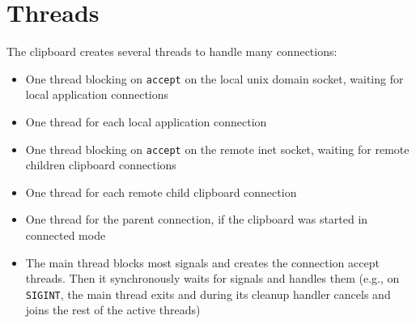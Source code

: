 \documentclass[a4paper, titlepage, english]{article}
\begin{document}
	\section{Threads}
	\par
	The clipboard creates several threads to handle many connections:
	\begin{itemize}
		\item One thread blocking on \texttt{accept} on the local unix domain socket, waiting for local application connections
		\item One thread for each local application connection
		\item One thread blocking on \texttt{accept} on the remote inet socket, waiting for remote children clipboard connections
		\item One thread for each remote child clipboard connection
		\item One thread for the parent connection, if the clipboard was started in connected mode
		\item The main thread blocks most signals and creates the connection accept threads. Then it synchronously waits for signals and handles them (e.g., on \texttt{SIGINT}, the main thread exits and during its cleanup handler cancels and joins the rest of the active threads)
	\end{itemize}
\end{document}
